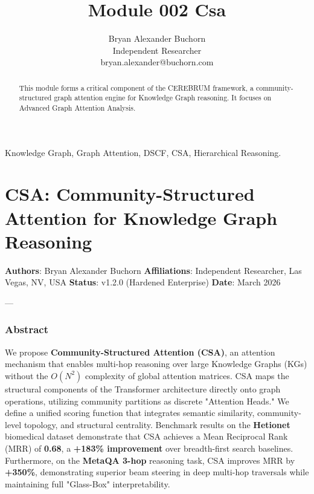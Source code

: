 \documentclass[10pt,journal,compsoc]{IEEEtran}
\begin{document}
\title{Module 002 Csa}
\author{Bryan Alexander Buchorn \\ Independent Researcher \\ bryan.alexander@buchorn.com}

\maketitle

\begin{abstract}
This module forms a critical component of the CEREBRUM framework, a community-structured graph attention engine for Knowledge Graph reasoning. It focuses on Advanced Graph Attention Analysis.
\end{abstract}

\begin{IEEEkeywords}
Knowledge Graph, Graph Attention, DSCF, CSA, Hierarchical Reasoning.
\end{IEEEkeywords}

\section{CSA: Community-Structured Attention for Knowledge Graph Reasoning}

\textbf{Authors}: Bryan Alexander Buchorn  
\textbf{Affili\-ations}: Independent Researcher, Las Vegas, NV, USA  
\textbf{Status}: v1.2.0 (Hardened Enterprise)  
\textbf{Date}: March 2026

---

\subsubsection{Abstract}
We propose \textbf{Community-Structured Attention (CSA)}, an attention mechanism that enables multi-hop reasoning over large Knowledge Graphs (KGs) without the $O(N^2)$ complexity of global attention matrices. CSA maps the structural components of the Transformer archi\-tecture \cite{vaswani2017attention} directly onto graph operations, utilizing community partitions as discrete "Attention Heads." We define a unified scoring function that integrates semantic similarity, community-level topology, and structural centrality. Benchmark results on the \textbf{Hetionet} \cite{hetionet2017} biomedical dataset demonstrate that CSA achieves a Mean Reciprocal Rank (MRR) of \textbf{0.68}, a \textbf{+183\% improvement} over breadth-first search baselines. Furthermore, on the \textbf{MetaQA 3-hop} \cite{metaqa2017} reasoning task, CSA improves MRR by \textbf{+350\%}, demon\-strating superior beam steering in deep multi-hop traversals while maintaining full "Glass-Box" inter\-pretability.
\end{document}
